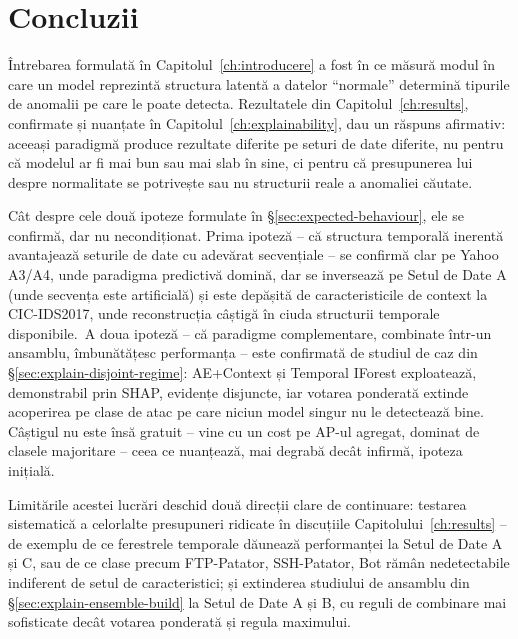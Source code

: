 \chapter{Concluzii}
\label{ch:concluzii}

Întrebarea formulată în Capitolul~\ref{ch:introducere} a fost în ce măsură modul în care un model reprezintă structura latentă a datelor \enquote{normale} determină tipurile de anomalii pe care le poate detecta. Rezultatele din Capitolul~\ref{ch:results}, confirmate și nuanțate în Capitolul~\ref{ch:explainability}, dau un răspuns afirmativ: aceeași paradigmă produce rezultate diferite pe seturi de date diferite, nu pentru că modelul ar fi mai bun sau mai slab în sine, ci pentru că presupunerea lui despre normalitate se potrivește sau nu structurii reale a anomaliei căutate.

Cât despre cele două ipoteze formulate în \S\ref{sec:expected-behaviour}, ele se confirmă, dar nu necondiționat. Prima ipoteză -- că structura temporală inerentă avantajează seturile de date cu adevărat secvențiale -- se confirmă clar pe Yahoo A3/A4, unde paradigma predictivă domină, dar se inversează pe Setul de Date A (unde secvența este artificială) și este depășită de caracteristicile de context la CIC-IDS2017, unde reconstrucția câștigă în ciuda structurii temporale disponibile.\
A doua ipoteză -- că paradigme complementare, combinate într-un ansamblu, îmbunătățesc performanța -- este confirmată de studiul de caz din \S\ref{sec:explain-disjoint-regime}: AE+Context și Temporal IForest exploatează, demonstrabil prin SHAP, evidențe disjuncte, iar votarea ponderată extinde acoperirea pe clase de atac pe care niciun model singur nu le detectează bine. Câștigul nu este însă gratuit -- vine cu un cost pe AP-ul agregat, dominat de clasele majoritare -- ceea ce nuanțează, mai degrabă decât infirmă, ipoteza inițială.

Limitările acestei lucrări deschid două direcții clare de continuare: testarea sistematică a celorlalte presupuneri ridicate în discuțiile Capitolului~\ref{ch:results} -- de exemplu de ce ferestrele temporale dăunează performanței la Setul de Date A și C, sau de ce clase precum FTP-Patator, SSH-Patator, Bot rămân nedetectabile indiferent de setul de caracteristici; și extinderea studiului de ansamblu din \S\ref{sec:explain-ensemble-build} la Setul de Date A și B, cu reguli de combinare mai sofisticate decât votarea ponderată și regula maximului.